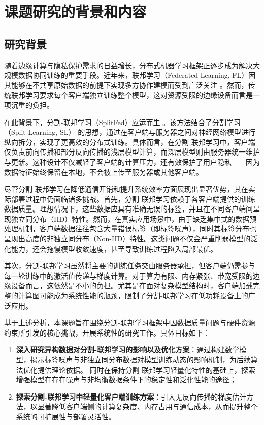 
\chapter{课题研究的背景和内容}
\section{研究背景}
随着边缘计算与隐私保护需求的日益增长，分布式机器学习框架正逐步成为解决大规模数据协同训练的重要手段。近年来，联邦学习（Federated Learning, FL）因其能够在不共享原始数据的前提下实现多方协作建模而受到广泛关注 \cite{b1}。然而，传统联邦学习要求每个客户端独立训练整个模型，这对资源受限的边缘设备而言是一项沉重的负担。

在此背景下，分割-联邦学习（SplitFed）应运而生 \cite{thapa2022splitfed}。该方法结合了分割学习（Split Learning, SL） \cite{b2} 的思想，通过在客户端与服务器之间对神经网络模型进行纵向拆分，实现了更高效的分布式训练。具体而言，在分割-联邦学习中，客户端仅负责前向传播和部分反向传播的浅层模型计算，而深层模型则由服务器统一维护与更新。这种设计不仅减轻了客户端的计算压力，还有效保护了用户隐私——因为数据特征始终保留在本地，不会被上传至服务器或其他客户端。

尽管分割-联邦学习在降低通信开销和提升系统效率方面展现出显著优势，其在实际部署过程中仍面临诸多挑战。首先，分割-联邦学习依赖于各客户端提供的训练数据质量。理想情况下，这些数据应具有准确无误的标签，并且在不同客户端间呈现独立同分布（IID）特性。然而，在真实应用场景中，由于缺乏集中式的数据预处理机制，客户端数据往往包含大量错误标签（即标签噪声），同时其标签分布也呈现出高度的非独立同分布（Non-IID）特性。这类问题不仅会严重削弱模型的泛化能力，还会拖慢模型收敛速度，甚至导致训练过程陷入局部最优。

其次，分割-联邦学习虽然将主要的训练任务交由服务器承担，但客户端仍需参与每一轮训练中的激活值传递与梯度计算。对于算力有限、内存紧张、带宽受限的边缘设备而言，这依然是不小的负担。尤其是在面对复杂模型结构时，客户端加载完整的计算图可能成为系统性能的瓶颈，限制了分割-联邦学习在低功耗设备上的广泛应用。

基于上述分析，本课题旨在围绕分割-联邦学习框架中因数据质量问题与硬件资源约束所引发的核心挑战，开展系统性的研究工作。具体目标如下：

\begin{enumerate}
    \item \textbf{深入研究异构数据对分割-联邦学习的影响以及优化方案}：通过构建数学模型，揭示标签噪声与非独立同分布数据对模型训练动态的影响机制，为后续算法优化提供理论依据。
    同时在保持分割-联邦学习轻量化特性的基础上，探索增强模型在存在噪声与非均衡数据条件下的稳定性和泛化性能的途径；
    \item \textbf{探索分割-联邦学习中轻量化客户端训练方案}：引入无反向传播的梯度估计方法，以显著降低客户端侧的计算复杂度、内存占用与通信成本，从而提升整个系统的可扩展性与部署灵活性。
\end{enumerate}

